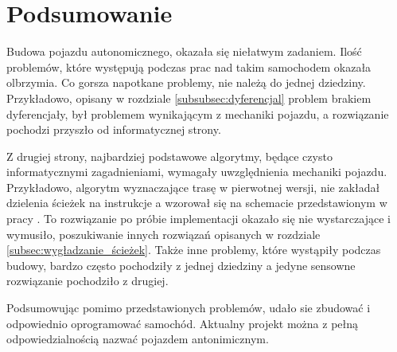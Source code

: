 \section{Podsumowanie}
    Budowa pojazdu autonomicznego, okazała się niełatwym zadaniem.
    Ilość problemów, które występują podczas prac nad takim samochodem okazała olbrzymia.
    Co gorsza napotkane problemy, nie należą do jednej dziedziny.
    Przykładowo, opisany w rozdziale \ref{subsubsec:dyferencjal} problem brakiem dyferencjały, był problemem wynikającym z mechaniki pojazdu, a rozwiązanie pochodzi przyszło od informatycznej strony.

    Z drugiej strony, najbardziej podstawowe algorytmy, będące czysto informatycznymi zagadnieniami, wymagały uwzględnienia mechaniki pojazdu.
    Przykładowo, algorytm wyznaczające trasę w pierwotnej wersji, nie zakładał dzielenia ścieżek na instrukcje a wzorował się na schemacie przedstawionym w pracy \cite{Simple_PathSmoothing}.
    To rozwiązanie po próbie implementacji okazało się nie wystarczające i wymusiło, poszukiwanie innych rozwiązań opisanych w rozdziale \ref{subsec:wygładzanie_ścieżek}.
    Także inne problemy, które wystąpiły podczas budowy, bardzo często pochodziły z jednej dziedziny a jedyne sensowne rozwiązanie pochodziło z drugiej.

    Podsumowując pomimo przedstawionych problemów, udało sie zbudować i odpowiednio oprogramować samochód.
    Aktualny projekt można z pełną odpowiedzialnością nazwać pojazdem antonimicznym.

